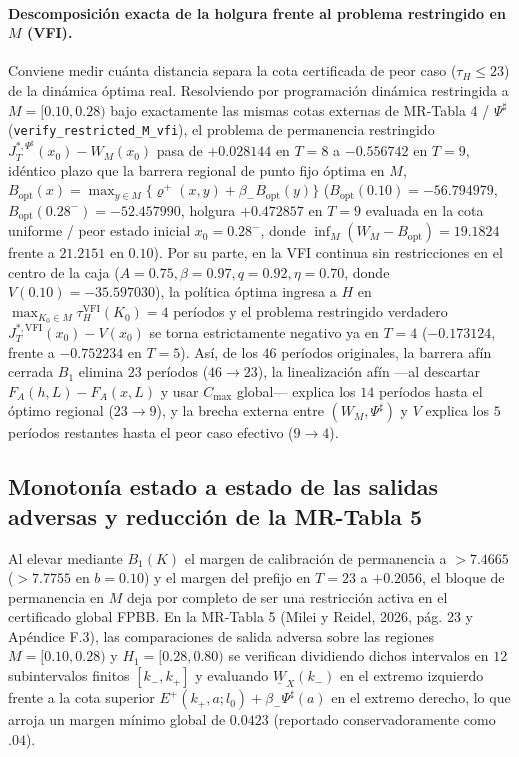 \documentclass[11pt,letterpaper]{article}
\theoremstyle{plain}
\begin{document}
\paragraph{Descomposición exacta de la holgura frente al problema restringido en $M$ (VFI).}
Conviene medir cuánta distancia separa la cota certificada de peor caso ($\tau_H\le 23$) de la dinámica óptima real. Resolviendo por programación dinámica restringida a $M=[0.10,0.28)$ bajo exactamente las mismas cotas externas de MR-Tabla 4 / $\Psi^\sharp$ (\texttt{verify\_restricted\_M\_vfi}), el problema de permanencia restringido $J_T^{*,\Psi^\sharp}(x_0)-W_M(x_0)$ pasa de $+0.028144$ en $T=8$ a $-0.556742$ en $T=9$, idéntico plazo que la barrera regional de punto fijo óptima en $M$, $B_{\mathrm{opt}}(x)=\max_{y\in M}\{\varrho^+(x,y)+\beta_- B_{\mathrm{opt}}(y)\}$ ($B_{\mathrm{opt}}(0.10)=-56.794979$, $B_{\mathrm{opt}}(0.28^-)=-52.457990$, holgura $+0.472857$ en $T=9$ evaluada en la cota uniforme / peor estado inicial $x_0=0.28^-$, donde $\inf_M(W_M-B_{\mathrm{opt}})=19.1824$ frente a $21.2151$ en $0.10$). Por su parte, en la VFI continua sin restricciones en el centro de la caja ($A=0.75,\beta=0.97,q=0.92,\eta=0.70$, donde $V(0.10)=-35.597030$), la política óptima ingresa a $H$ en $\max_{K_0\in M}\tau_H^{\mathrm{VFI}}(K_0)=4$ períodos y el problema restringido verdadero $J_T^{*,\mathrm{VFI}}(x_0)-V(x_0)$ se torna estrictamente negativo ya en $T=4$ ($-0.173124$, frente a $-0.752234$ en $T=5$). Así, de los $46$ períodos originales, la barrera afín cerrada $B_1$ elimina $23$ períodos ($46\to 23$), la linealización afín ---al descartar $F_A(h,L)-F_A(x,L)$ y usar $C_{\max}$ global--- explica los $14$ períodos hasta el óptimo regional ($23\to 9$), y la brecha externa entre $(W_M,\Psi^\sharp)$ y $V$ explica los $5$ períodos restantes hasta el peor caso efectivo ($9\to 4$).

\subsection{Monotonía estado a estado de las salidas adversas y reducción de la MR-Tabla 5}

Al elevar mediante $B_1(K)$ el margen de calibración de permanencia a $>7.4665$ ($>7.7755$ en $b=0.10$) y el margen del prefijo en $T=23$ a $+0.2056$, el bloque de permanencia en $M$ deja por completo de ser una restricción activa en el certificado global FPBB. En la MR-Tabla 5 (Milei y Reidel, 2026, pág. 23 y Apéndice F.3), las comparaciones de salida adversa sobre las regiones $M=[0.10,0.28)$ y $H_1=[0.28,0.80)$ se verifican dividiendo dichos intervalos en $12$ subintervalos finitos $[k_-,k_+]$ y evaluando $\underline{W}_X(k_-)$ en el extremo izquierdo frente a la cota superior $E^+(k_+,a;l_0)+\beta_-\Psi^\sharp(a)$ en el extremo derecho, lo que arroja un margen mínimo global de $0.0423$ (reportado conservadoramente como $.04$).
\end{document}
